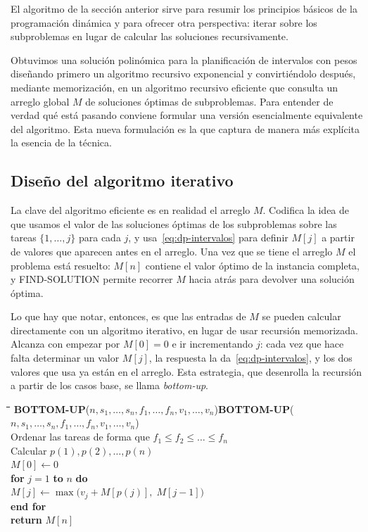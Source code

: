 \documentclass[12pt, spanish, oneside, openany]{book}
\newcommand{\pl}[1]{\makebox[1.6em][r]{\texttt{\footnotesize #1}}\hspace{0.9em}}
\newenvironment{pseudo}[1]{%
  \begin{center}%
  \begin{mdframed}[style=pseudobox]%
  \small
  \begin{tabbing}%
  \hspace{2.5em}\=\hspace{1.5em}\=\hspace{1.5em}\=\hspace{1.5em}\=\hspace{1.5em}\=\kill
  \def\pseudotitulo{#1}\ifx\pseudotitulo\empty\else#1\\[3pt]\fi}%
  {\end{tabbing}\end{mdframed}\end{center}}
\newcommand{\alg}[1]{#1}
\theoremstyle{uprightplain}
\theoremstyle{definition}
\theoremstyle{remark}
\theoremstyle{definition}
\begin{document}
El algoritmo de la sección anterior sirve para resumir los principios básicos de la programación dinámica y para ofrecer otra perspectiva: iterar sobre los subproblemas en lugar de calcular las soluciones recursivamente.

Obtuvimos una solución polinómica para la planificación de intervalos con pesos diseñando primero un algoritmo recursivo exponencial y convirtiéndolo después, mediante memorización, en un algoritmo recursivo eficiente que consulta un arreglo global $M$ de soluciones óptimas de subproblemas. Para entender de verdad qué está pasando conviene formular una versión esencialmente equivalente del algoritmo. Esta nueva formulación es la que captura de manera más explícita la esencia de la técnica.

\subsection{Diseño del algoritmo iterativo}

La clave del algoritmo eficiente es en realidad el arreglo $M$. Codifica la idea de que usamos el valor de las soluciones óptimas de los subproblemas sobre las tareas $\{1,\dots,j\}$ para cada $j$, y usa~\eqref{eq:dp-intervalos} para definir $M[j]$ a partir de valores que aparecen antes en el arreglo. Una vez que se tiene el arreglo $M$ el problema está resuelto: $M[n]$ contiene el valor óptimo de la instancia completa, y \alg{FIND-SOLUTION} permite recorrer $M$ hacia atrás para devolver una solución óptima.

Lo que hay que notar, entonces, es que las entradas de $M$ se pueden calcular directamente con un algoritmo iterativo, en lugar de usar recursión memorizada. Alcanza con empezar por $M[0]=0$ e ir incrementando $j$: cada vez que hace falta determinar un valor $M[j]$, la respuesta la da~\eqref{eq:dp-intervalos}, y los dos valores que usa ya están en el arreglo. Esta estrategia, que desenrolla la recursión a partir de los casos base, se llama \emph{bottom-up}.

\begin{pseudo}{\textbf{BOTTOM-UP}($n, s_1,\dots,s_n, f_1,\dots,f_n, v_1,\dots,v_n$)}
\pl{1}\> Ordenar las tareas de forma que $f_1\le f_2\le\dots\le f_n$\\
\pl{2}\> Calcular $p(1), p(2),\dots,p(n)$\\
\pl{3}\> $M[0] \leftarrow 0$\\
\pl{4}\> \textbf{for} $j = 1$ \textbf{to} $n$ \textbf{do}\\
\pl{5}\>\> $M[j] \leftarrow \max\bigl(v_j + M[p(j)],\; M[j-1]\bigr)$\\
\pl{6}\> \textbf{end for}\\
\pl{7}\> \textbf{return} $M[n]$
\end{pseudo}
\end{document}
